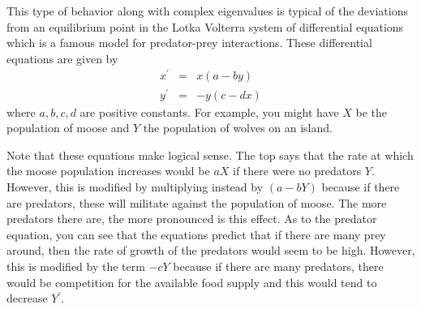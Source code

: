 This type of behavior along with complex eigenvalues is typical of the
deviations from an equilibrium point in the Lotka Volterra system of
differential equations which is a famous model for predator-prey
interactions. These differential equations are given by
\begin{eqnarray*}
  x^{\prime } &=&x(a-by) \\
  y^{\prime } &=&-y(c-dx)
\end{eqnarray*}
where $a,b,c,d$ are positive constants. For example, you might have
$X$ be the population of moose and $Y$ the population of wolves on an
island.

Note that these equations make logical sense. The top says that the
rate at which the moose population increases would be $aX$ if there
were no predators $Y$.  However, this is modified by multiplying
instead by $(a-bY) $ because if there are predators, these will
militate against the population of moose.  The more predators there
are, the more pronounced is this effect. As to the predator equation,
you can see that the equations predict that if there are many prey
around, then the rate of growth of the predators would seem to be
high. However, this is modified by the term $-cY$ because if there are
many predators, there would be competition for the available food
supply and this would tend to decrease $Y^{\prime }$.


